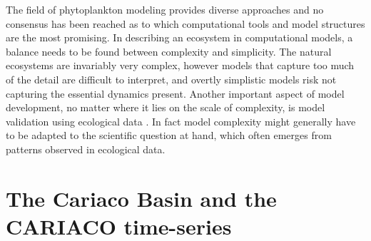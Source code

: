 The field of phytoplankton modeling provides diverse approaches and no consensus has been reached as to which computational tools and model structures are the most promising. In describing an ecosystem in computational models, a balance needs to be found between complexity and simplicity. The natural ecosystems are invariably very complex, however models that capture too much of the detail are difficult to interpret, and overtly simplistic models risk not capturing the essential dynamics present. Another important aspect of model development, no matter where it lies on the scale of complexity, is model validation using ecological data \citep{RykielJr1996}. In fact model complexity might generally have to be adapted to the scientific question at hand, which often emerges from patterns observed in ecological data. 


\section{The Cariaco Basin and the CARIACO time-series}
\label{CARIACOintro}


